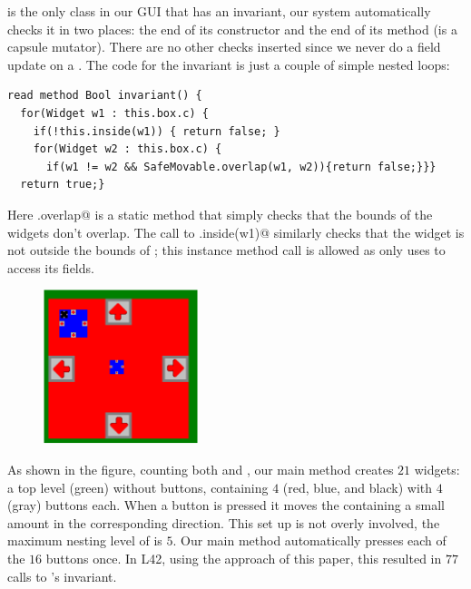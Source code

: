 \Q@SafeMovable@ is the only class in our GUI that has an invariant, our system automatically checks it in two places: the end of its constructor and the end of its \Q@dispatch@ method (is a capsule mutator). There are no other checks inserted since we never do a field update on a \Q@SafeMovable@. The code for the invariant is just a couple of simple nested loops:
\begin{lstlisting}
read method Bool invariant() {
  for(Widget w1 : this.box.c) {
    if(!this.inside(w1)) { return false; }
    for(Widget w2 : this.box.c) {
      if(w1 != w2 && SafeMovable.overlap(w1, w2)){return false;}}}
  return true;}
\end{lstlisting}
Here \Q@SafeMovable.overlap@ is a static method that simply checks that the bounds of the widgets don't overlap. The call to \Q@this.inside(w1)@ similarly checks that the widget is not outside the bounds of \Q@this@; this instance method call is allowed as \Q@inside@ only uses \Q@this@ to access its fields.%


\begin{figure}
    \centering\includegraphics[width=0.4\textwidth]{GuiImg}\end{figure}
 As shown in the figure, counting both \Q@SafeMovable@s and \Q@Button@s, our main method creates $21$ widgets: a top level (green) \Q@SafeMovable@ without buttons, containing $4$ (red, blue, and black) \Q@SafeMovable@s with
$4$ (gray) buttons each. When a button is pressed it moves the containing \Q@SafeMovable@ a small amount in the corresponding direction.
This set up is not overly involved, the maximum nesting level of \Q@Widget@s is $5$.
Our main method automatically presses each of the $16$ buttons once. In L42, using the approach of this paper, this resulted in $77$ calls to \Q@SafeMovable@'s invariant.

